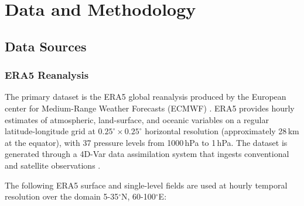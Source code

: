 \ifpdf
\graphicspath{{Chapter3/Figs/Raster/}{Chapter3/Figs/PDF/}{Chapter3/Figs/}}
\else
\graphicspath{{Chapter3/Figs/Vector/}{Chapter3/Figs/}}
\fi

\chapter{Data and Methodology}
\label{ch:methodology}

\section{Data Sources}
\label{sec:data_sources}

\subsection{ERA5 Reanalysis}
\label{subsec:era5}

The primary dataset is the ERA5 global reanalysis produced by the
European center for Medium-Range Weather Forecasts (ECMWF)
\citep{hersbach2020era5}. ERA5 provides hourly estimates of
atmospheric, land-surface, and oceanic variables on a regular
latitude-longitude grid at $0.25^\circ \times 0.25^\circ$ horizontal
resolution (approximately 28\,km at the equator), with 37 pressure
levels from 1000\,hPa to 1\,hPa. The dataset is generated through a
4D-Var data assimilation system that ingests conventional and
satellite observations \citep{hersbach2020era5}.

The following ERA5 surface and single-level fields are used at hourly
temporal resolution over the domain 5-35$^\circ$N, 60-100$^\circ$E:

